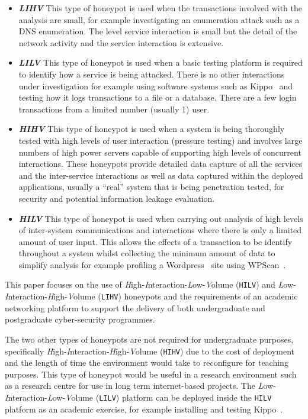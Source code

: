 \begin{itemize}
\item \noindent \emph{\textbf{LIHV}} This type of honeypot is used when the transactions involved with the analysis are small, for example investigating an enumeration attack such as a DNS enumeration. The level service interaction is small but the detail of the network activity and the service interaction is extensive.

\item \noindent \emph{\textbf{LILV}} This type of honeypot is used when a basic testing platform is required to identify how a service is being attacked. There is no other interactions under investigation for example using software systems such as Kippo~\cite{D:16,SH:15} and testing how it logs transactions to a file or a database. There are a few login transactions from a limited number (usually 1) user.

\item \noindent \emph{\textbf{HIHV}} This type of honeypot is used when a system is being thoroughly tested with high levels of user interaction (pressure testing) and involves large numbers of high power servers capable of supporting high levels of concurrent interactions. These honeypots provide detailed data capture of all the services and the inter-service interactions as well as data captured within the deployed applications, usually a ``real'' system that is being penetration tested, for security and potential information leakage evaluation.  

\item \noindent \emph{\textbf{HILV}} This type of honeypot is used when carrying out analysis of high levels of inter-system communications and interactions where there is only a limited amount of user input. This allows the effects of a transaction to be identify throughout a system whilst collecting the minimum amount of data to simplify analysis for example profiling a Wordpress~\cite{WP:17} site using WPScan~\cite{WT:17}. 
\end{itemize}

This paper focuses on the use of \emph{H}igh-\emph{I}nteraction-\emph{L}ow-\emph{V}olume (\texttt{HILV}) and \emph{L}ow-\emph{I}nteraction-\emph{H}igh-\emph{V}olume (\texttt{LIHV}) honeypots and the requirements of an academic networking platform to support the delivery of both undergraduate and postgraduate cyber-security programmes. 

The two other types of honeypots are not required for undergraduate purposes, specifically \emph{H}igh-\emph{I}nteraction-\emph{H}igh-\emph{V}olume (\texttt{HIHV}) due to the cost of deployment and the length of time the environment would take to reconfigure for teaching purposes. This type of honeypot would be useful in a research environment such as a research centre for use in long term internet-based projects. The \emph{L}ow-\emph{I}nteraction-\emph{L}ow-\emph{V}olume (\texttt{LILV}) platform can be deployed inside the \texttt{HILV} platform as an academic exercise, for example installing and testing Kippo~\cite{D:16,SH:15}.

